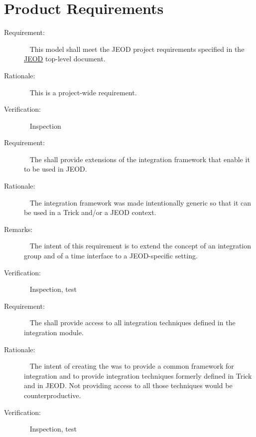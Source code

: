 \chapter{Product Requirements}\label{ch:reqt}

\label{reqt:toplevel}
\begin{description}
\item[Requirement:]\ \newline
  This model shall meet the JEOD project requirements specified in the 
  \hyperref{file:\JEODHOME/docs/JEOD.pdf}{part1}{reqt}{JEOD} top-level document.

\item[Rationale:]\ \newline
  This is a project-wide requirement.

\item[Verification:]\ \newline
  Inspection
\end{description}


 \label{reqt:use_er7_utils}
\begin{description}
\item[Requirement:]\ \newline
 The \ModelDesc shall provide extensions of the \erseven integration
 framework that enable it to be used in JEOD.

\item[Rationale:]\ \newline
 The \erseven integration framework was made intentionally generic so that
 it can be used in a Trick and/or a JEOD context.

\item[Remarks:]\ \newline
 The intent of this requirement is to extend the \erseven concept of an
 integration group and of a time interface to a JEOD-specific setting.

\item[Verification:]\ \newline
 Inspection, test
\end{description}


 \label{reqt:supported_er7_techniques}
\begin{description}
\item[Requirement:]\ \newline
 The \ModelDesc shall provide access to all integration techniques defined in the
 \erseven integration module.

\item[Rationale:]\ \newline
 The intent of creating the \erseven was to provide a common framework for
 integration and to provide integration techniques formerly defined in Trick and in
 JEOD. Not providing access to all those techniques would be counterproductive.

\item[Verification:]\ \newline
 Inspection, test
\end{description}


